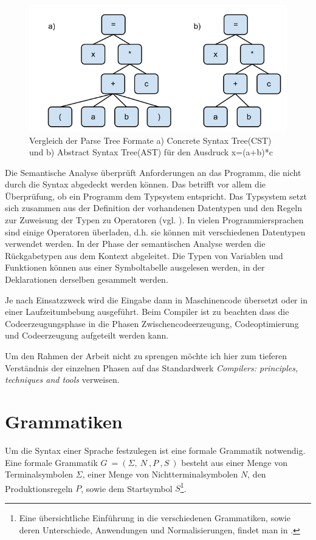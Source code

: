 \begin{figure}[h]
\includegraphics[width=\textwidth,scale=0.5]{figures/ast_vs_cst.png}
\caption{Vergleich der Parse Tree Formate a) Concrete Syntax Tree(CST) und b) Abstract Syntax Tree(AST) für den Ausdruck x=(a+b)*c}
\label{abb_ast_vs_cst}
\end{figure}

Die Semantische Analyse überprüft Anforderungen an das Programm, die nicht durch die Syntax abgedeckt werden können. Das betrifft vor allem die Überprüfung, ob ein Programm dem Typsystem entspricht. Das Typsystem setzt sich zusammen aus der Definition der vorhandenen Datentypen und den Regeln zur Zuweisung der Typen zu Operatoren (vgl. \cite[S. 426]{AhSe86}). In vielen Programmiersprachen sind einige Operatoren überladen, d.h. sie können mit verschiedenen Datentypen verwendet werden. In der Phase der semantischen Analyse werden die Rückgabetypen aus dem Kontext abgeleitet. Die Typen von Variablen und Funktionen können aus einer Symboltabelle ausgelesen werden, in der Deklarationen derselben gesammelt werden.

Je nach Einsatzzweck wird die Eingabe dann in Maschinencode übersetzt oder in einer Laufzeitumbebung ausgeführt. Beim Compiler ist zu beachten dass die Codeerzeugungsphase in die Phasen Zwischencodeerzeugung, Codeoptimierung und Codeerzeugung aufgeteilt werden kann. 

Um den Rahmen der Arbeit nicht zu sprengen möchte ich hier zum tieferen Verständnis der einzelnen Phasen auf das Standardwerk \emph{Compilers: principles, techniques and tools} \cite{AhSe86} verweisen.


\section{Grammatiken}

Um die Syntax einer Sprache festzulegen ist eine formale Grammatik not\-wen\-dig. Eine formale Grammatik $G \ = (\Sigma,\ N\ ,P\ ,S\ )$ besteht aus einer Menge von Terminalsymbolen $\Sigma$, einer Menge von Nichtterminalsymbolen $N$, den Produktionsregeln $P$, sowie dem Startsymbol $S$\footnote{Eine übersichtliche Ein\-füh\-rung in die verschiedenen Grammatiken, sowie deren Unterschiede, Anwendungen und Normalisierungen, findet man in \cite{VoWi02}.}.

